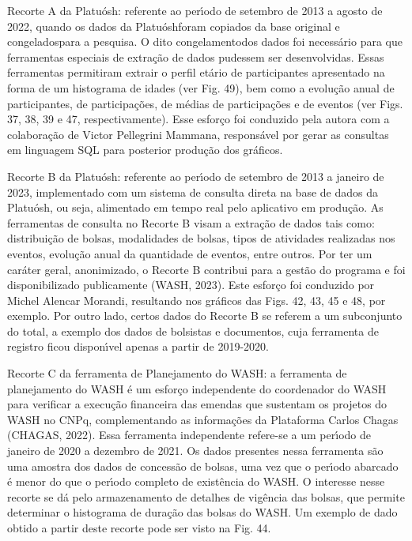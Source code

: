 \documentclass[
12pt,		%
openright,	%
twoside,  %
a4paper,			%
chapter=TITLE,		%
english,			%
french,				%
spanish,			%
brazil				%
]{USPSC-classe/USPSC}
\begin{document}
\begin{alineas}
\item Recorte A da Platu\'osh: referente ao per\'{\i}odo de setembro de 2013 a agosto de 2022, quando os dados da \textquotedbl Platu\'osh\textquotedbl  foram copiados da base original e \textquotedbl congelados\textquotedbl  para a pesquisa. O dito  \textquotedbl congelamento\textquotedbl  dos dados foi necess\'ario para que ferramentas especiais de extra\c{c}\~ao de dados pudessem ser desenvolvidas. Essas ferramentas permitiram extrair o perfil et\'ario de participantes apresentado na forma de um histograma de idades (ver Fig. 49), bem como a evolu\c{c}\~ao anual de participantes, de participa\c{c}\~oes, de m\'edias de participa\c{c}\~oes e de eventos (ver Figs. 37, 38, 39 e 47, respectivamente). Esse esfor\c{c}o foi conduzido pela autora com a colabora\c{c}\~ao de Victor Pellegrini Mammana, respons\'avel por gerar as consultas em linguagem SQL para posterior produ\c{c}\~ao dos gr\'aficos.
\item Recorte B da Platu\'osh: referente ao per\'{\i}odo de setembro de 2013 a janeiro de 2023, implementado com um sistema de consulta direta na base de dados da \textquotedbl Platu\'osh\textquotedbl , ou seja, alimentado em tempo real pelo aplicativo em produ\c{c}\~ao. As ferramentas de consulta no Recorte B visam a extra\c{c}\~ao de dados tais como: distribui\c{c}\~ao de bolsas, modalidades de bolsas, tipos de atividades realizadas nos eventos, evolu\c{c}\~ao anual da quantidade de eventos,  entre outros. Por ter um car\'ater geral, anonimizado, o Recorte B contribui para a gest\~ao do programa e foi disponibilizado publicamente  (WASH, 2023). Este esfor\c{c}o foi conduzido por Michel Alencar Morandi, resultando nos gr\'aficos das  Figs. 42, 43, 45 e 48, por exemplo. Por outro lado, certos dados do Recorte B se referem a um subconjunto do total, a exemplo dos dados de bolsistas e documentos, cuja ferramenta de registro ficou dispon\'{\i}vel apenas a partir de 2019-2020.
\item Recorte C da ferramenta de Planejamento do WASH: a ferramenta de planejamento do WASH \'e um esfor\c{c}o independente do coordenador do WASH para verificar a execu\c{c}\~ao financeira das emendas que sustentam os projetos do WASH no CNPq, complementando as informa\c{c}\~oes da Plataforma Carlos Chagas  (CHAGAS, 2022). Essa ferramenta independente refere-se a um per\'{\i}odo de janeiro de 2020 a dezembro de 2021. Os dados presentes nessa ferramenta s\~ao uma amostra dos dados de concess\~ao de bolsas, uma vez que o per\'{\i}odo abarcado \'e menor do que o per\'{\i}odo completo de exist\^encia do WASH. O interesse nesse recorte se d\'a pelo armazenamento de detalhes de vig\^encia das bolsas, que permite determinar o histograma de dura\c{c}\~ao das bolsas do WASH. Um exemplo de dado obtido a partir deste recorte pode ser visto na Fig. 44.
\end{alineas}
\end{document}
